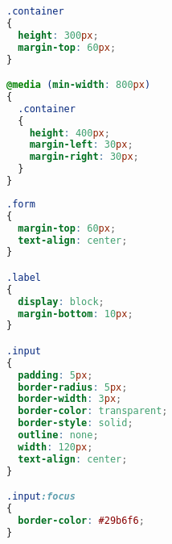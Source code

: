 \documentclass[12pt,a4paper,oneside]{book}
\begin{document}
\bigskip

\begin{lstlisting}[title={raspberrypi/ui/styles/LineGraph.module.css}, language=CSS]
.container
{
  height: 300px;
  margin-top: 60px;
}

@media (min-width: 800px)
{
  .container
  {
    height: 400px;
    margin-left: 30px;
    margin-right: 30px;
  }
}
\end{lstlisting}

\bigskip

\begin{lstlisting}[title={raspberrypi/ui/styles/TextField.module.css}, language=CSS]
.form
{
  margin-top: 60px;
  text-align: center;
}

.label
{
  display: block;
  margin-bottom: 10px;
}

.input
{
  padding: 5px;
  border-radius: 5px;
  border-width: 3px;
  border-color: transparent;
  border-style: solid;
  outline: none;
  width: 120px;
  text-align: center;
}

.input:focus
{
  border-color: #29b6f6;
}
\end{lstlisting}


\backmatter
\cleardoublepage{}


\end{document}
